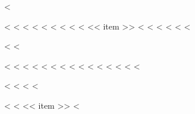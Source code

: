 <%

<%
\frontmatter
<%
<%
<%
<%
<%
<%
<%
<%
<< item >>
<%
<%
  <%
\renewcommand*\contentsname{<< toc_title >>}
  <%
{
\setcounter{tocdepth}{<< toc_depth >>}
\tableofcontents
}
<%
<%
\listoffigures
<%
<%
\listoftables
<%
<%
<%
<%
\mainmatter
<%
<%
<%
\backmatter
<%
<%
  <%
    <%
      <%
\renewcommand\bibname{<< biblio_title >>}
      <%
\renewcommand\refname{<< biblio_title >>}
      <%
    <%
  

  <%
<%
<%
\printbibliography<%

<%
<%
<< item >>
<%

